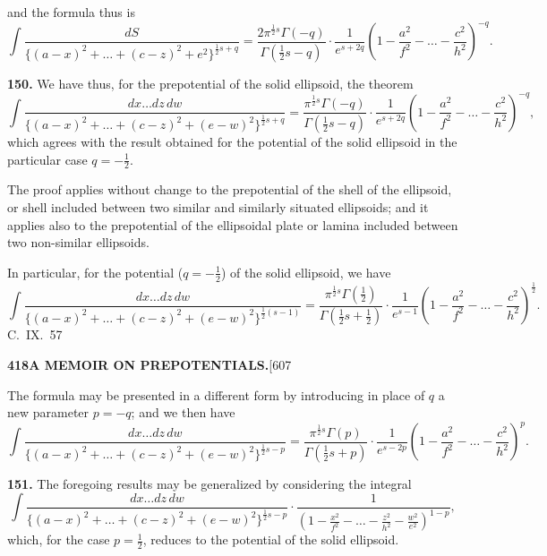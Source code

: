 \documentclass[11pt,a4paper]{book}
\begin{document}
{and the formula thus is
\[
\int \frac{dS}{\{(a-x)^2 + \ldots + (c-z)^2 + e^2\}^{\frac{1}{2}s+q}} = \frac{2\pi^{\frac{1}{2}s}\Gamma(-q)}{\Gamma(\frac{1}{2}s-q)} \cdot \frac{1}{e^{s+2q}} \left(1 - \frac{a^2}{f^2} - \ldots - \frac{c^2}{h^2}\right)^{-q}.
\]

\medskip
\noindent\textbf{150.}
We have thus, for the prepotential of the solid ellipsoid, the theorem
\[
\int \frac{dx\ldots dz\, dw}{\{(a-x)^2 + \ldots + (c-z)^2 + (e-w)^2\}^{\frac{1}{2}s+q}} = \frac{\pi^{\frac{1}{2}s}\Gamma(-q)}{\Gamma(\frac{1}{2}s-q)} \cdot \frac{1}{e^{s+2q}} \left(1 - \frac{a^2}{f^2} - \ldots - \frac{c^2}{h^2}\right)^{-q},
\]
which agrees with the result obtained for the potential of the solid ellipsoid in the particular case $q = -\frac{1}{2}$.

The proof applies without change to the prepotential of the shell of the ellipsoid, or shell included between two similar and similarly situated ellipsoids; and it applies also to the prepotential of the ellipsoidal plate or lamina included between two non-similar ellipsoids.

In particular, for the potential ($q = -\frac{1}{2}$) of the solid ellipsoid, we have
\[
\int \frac{dx\ldots dz\, dw}{\{(a-x)^2 + \ldots + (c-z)^2 + (e-w)^2\}^{\frac{1}{2}(s-1)}} = \frac{\pi^{\frac{1}{2}s}\Gamma(\frac{1}{2})}{\Gamma(\frac{1}{2}s+\frac{1}{2})} \cdot \frac{1}{e^{s-1}} \left(1 - \frac{a^2}{f^2} - \ldots - \frac{c^2}{h^2}\right)^{\frac{1}{2}}.
\]
\hfill C.~IX.\ 57

\newpage
\noindent\textbf{418}\hspace{\fill}\textbf{A MEMOIR ON PREPOTENTIALS.}\hspace{\fill}[607

The formula may be presented in a different form by introducing in place of $q$ a new parameter $p = -q$; and we then have
\[
\int \frac{dx\ldots dz\, dw}{\{(a-x)^2 + \ldots + (c-z)^2 + (e-w)^2\}^{\frac{1}{2}s-p}} = \frac{\pi^{\frac{1}{2}s}\Gamma(p)}{\Gamma(\frac{1}{2}s+p)} \cdot \frac{1}{e^{s-2p}} \left(1 - \frac{a^2}{f^2} - \ldots - \frac{c^2}{h^2}\right)^{p}.
\]

\medskip
\noindent\textbf{151.}
The foregoing results may be generalized by considering the integral
\[
\int \frac{dx\ldots dz\, dw}{\{(a-x)^2 + \ldots + (c-z)^2 + (e-w)^2\}^{\frac{1}{2}s-p}} \cdot \frac{1}{(1 - \frac{x^2}{f^2} - \ldots - \frac{z^2}{h^2} - \frac{w^2}{e^2})^{1-p}},
\]
which, for the case $p = \frac{1}{2}$, reduces to the potential of the solid ellipsoid.

}
\end{document}
